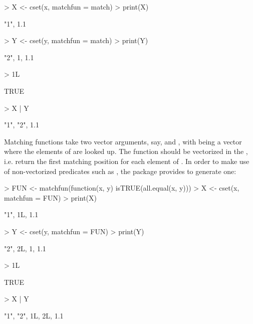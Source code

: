 \documentclass[article]{jss}
\newcommand{\codefun}[1]{\code{#1()}}
\begin{document}
\begin{Schunk}
\begin{Sinput}
> X <- cset(x, matchfun = match)
> print(X)
\end{Sinput}
\begin{Soutput}
{"1", 1.1}
\end{Soutput}
\begin{Sinput}
> Y <- cset(y, matchfun = match)
> print(Y)
\end{Sinput}
\begin{Soutput}
{"2", 1, 1.1}
\end{Soutput}
\begin{Sinput}
> 1L %
\end{Sinput}
\begin{Soutput}
[1] TRUE
\end{Soutput}
\begin{Sinput}
> X | Y
\end{Sinput}
\begin{Soutput}
{"1", "2", 1.1}
\end{Soutput}
\end{Schunk}
Matching functions take two
vector arguments, say,  and ,
with  being a vector where the elements of  are looked up.
The function should be vectorized in the , i.e. return the
first matching position for each element of .
In order to make use of non-vectorized
predicates such as \codefun{all.equal}, the  package
provides \codefun{matchfun} to generate one:
\begin{Schunk}
\begin{Sinput}
> FUN <- matchfun(function(x, y) isTRUE(all.equal(x, y)))
> X <- cset(x, matchfun = FUN)
> print(X)
\end{Sinput}
\begin{Soutput}
{"1", 1L, 1.1}
\end{Soutput}
\begin{Sinput}
> Y <- cset(y, matchfun = FUN)
> print(Y)
\end{Sinput}
\begin{Soutput}
{"2", 2L, 1, 1.1}
\end{Soutput}
\begin{Sinput}
> 1L %
\end{Sinput}
\begin{Soutput}
[1] TRUE
\end{Soutput}
\begin{Sinput}
> X | Y
\end{Sinput}
\begin{Soutput}
{"1", "2", 1L, 2L, 1.1}
\end{Soutput}
\end{Schunk}
\end{document}
